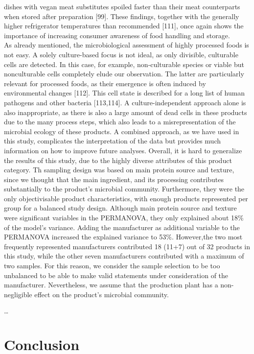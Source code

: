 \documentclass[preprint,3p,
a4paper]{elsarticle} %
\begin{document}
dishes with vegan meat substitutes spoiled faster than their meat
counterparts when stored after preparation {[}99{]}. These findings,
together with the generally higher refrigerator temperatures than
recommended {[}111{]}, once again shows the importance of increasing
consumer awareness of food handling and storage.\\
As already mentioned, the microbiological assessment of highly processed
foods is not easy. A solely culture-based focus is not ideal, as only
divisible, culturable cells are detected. In this case, for example,
non-culturable species or viable but nonculturable cells completely
elude our observation. The latter are particularly relevant for
processed foods, as their emergence is often induced by environmental
changes {[}112{]}. This cell state is described for a long list of human
pathogens and other bacteria {[}113,114{]}. A culture-independent
approach alone is also inappropriate, as there is also a large amount of
dead cells in these products due to the many process steps, which also
leads to a misrepresentation of the microbial ecology of these products.
A combined approach, as we have used in this study, complicates the
interpretation of the data but provides much information on how to
improve future analyses. Overall, it is hard to generalize the results
of this study, due to the highly diverse attributes of this product
category. Th sampling design was based on main protein source and
texture, since we thought that the main ingredient, and its processing
contributes substantially to the product's microbial community.
Furthermore, they were the only objectivisable product characteristics,
with enough products represented per group for a balanced study design.
Although main protein source and texture were significant variables in
the PERMANOVA, they only explained about 18\% of the model's variance.
Adding the manufacturer as additional variable to the PERMANOVA
increased the explained variance to 53\%. However,the two most
frequently represented manufacturers contributed 18 (11+7) out of 32
products in this study, while the other seven manufacturers contributed
with a maximum of two samples. For this reason, we consider the sample
selection to be too unbalanced to be able to make valid statements under
consideration of the manufacturer. Nevertheless, we assume that the
production plant has a non-negligible effect on the product's microbial
community.

\ldots{}

\hypertarget{conclusion}{%
\section{Conclusion}\label{conclusion}}
\end{document}
